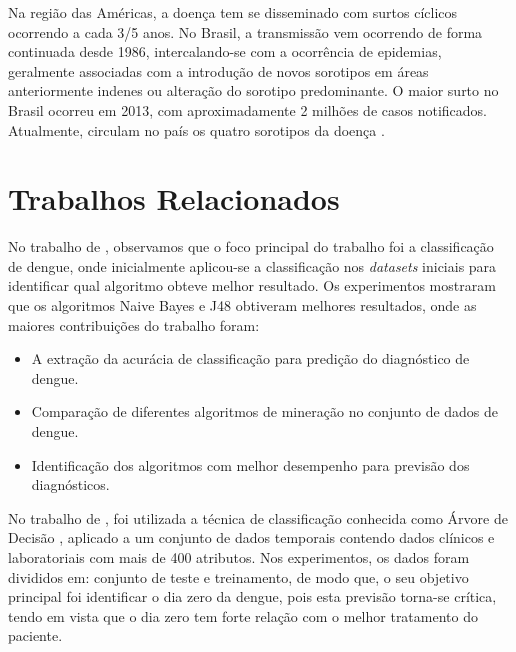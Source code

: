 \documentclass[
	12pt,				%
	openright,			%
	oneside,	
	a4paper,				%
	english,				%
	brazil				%
]{abntex2/abntex2} %
\begin{document}
	Na região das Américas, a doença tem se disseminado com surtos cíclicos ocorrendo a cada 3/5 anos. No Brasil, a transmissão vem ocorrendo de forma continuada desde 1986, intercalando-se com a ocorrência de epidemias, geralmente associadas com a introdução de novos sorotipos em áreas anteriormente indenes ou alteração do sorotipo predominante. O maior surto no Brasil ocorreu em 2013, com aproximadamente 2 milhões de casos notificados. Atualmente, circulam no país os quatro sorotipos da doença \cite{MS:2015}.
	

	
	\section{Trabalhos Relacionados}	
	
	No trabalho de \cite{shakil:2015}, observamos que o foco principal do trabalho foi a classificação de dengue, onde inicialmente aplicou-se a classificação nos \textit{datasets} iniciais para identificar qual algoritmo obteve melhor resultado. Os experimentos mostraram que os algoritmos Naive Bayes e J48 obtiveram melhores resultados, onde as maiores contribuições do trabalho foram:
	
	\begin{itemize}
		\item A extração da acurácia de classificação para predição do diagnóstico de dengue.
		\item Comparação de diferentes algoritmos de mineração no conjunto de dados de dengue.
		\item Identificação dos algoritmos com melhor desempenho para previsão dos diagnósticos.
	\end{itemize}
	
	No trabalho de \cite{thitiprayoonwongse:2012}, foi utilizada a técnica de classificação conhecida como Árvore de Decisão \cite{tan:2009}, aplicado a um conjunto de dados temporais contendo dados clínicos e laboratoriais com mais de 400 atributos. Nos experimentos, os dados foram divididos em: conjunto de teste e treinamento, de modo que, o seu objetivo principal foi identificar o dia zero da dengue, pois esta previsão torna-se crítica, tendo em vista que o dia zero tem forte relação com o melhor tratamento do paciente.
	
\end{document}
